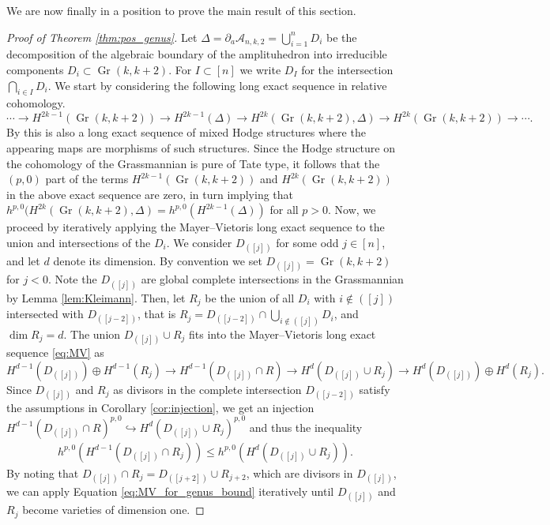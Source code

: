 \documentclass[12pt]{extarticle}
\theoremstyle{definition}
\theoremstyle{theorem}
\theoremstyle{remark}
\numberwithin{equation}{section}
\newcommand{\grk}{\operatorname{Gr}(k,k+2)}
\newcommand{\aA}{\mathcal{A}}
\newcommand{\odd}[1]{([#1])}
\begin{document}
We are now finally in a position to prove the main result of this section.

\begin{proof}[Proof of Theorem \ref{thm:pos_genus}]
    Let $\Delta = \partial_a\aA_{n,k,2}=\bigcup_{i=1}^{n}D_i$ be the decomposition of the algebraic boundary of the amplituhedron into irreducible components $D_i\subset\grk$.
    For $I\subset [n]$ we write $D_I$ for the intersection $\bigcap_{i\in I}D_i$.
    We start by considering the following long exact sequence in relative cohomology.
    \[
    \cdots \to H^{2k-1}(\grk)\to H^{2k-1}(\Delta)\to H^{2k}(\grk,\Delta)\to H^{2k}(\grk)\to\cdots.
    \]
    By \cite[Proposition 5.46]{MHS} this is also a long exact sequence of mixed Hodge structures where the appearing maps are morphisms of such structures.
    Since the Hodge structure on the cohomology of the Grassmannian is pure of Tate type, it follows that the $(p,0)$ part of the terms $H^{2k-1}(\grk)$ and $H^{2k}(\grk)$ in the above exact sequence are zero, in turn implying that $h^{p,0}(H^{2k}(\grk,\Delta)=h^{p,0}(H^{2k-1}(\Delta))$ for all $p>0$.
    Now, we proceed by iteratively applying the Mayer--Vietoris long exact sequence to the union and intersections of the $D_i$.
    We consider $D_{\odd j}$ for some odd $j\in [n]$, and let $d$ denote its dimension.
    By convention we set $D_{\odd j}=\grk$ for $j<0$.
    Note the $D_{\odd j}$ are global complete intersections in the Grassmannian by Lemma \ref{lem:Kleimann}.
    Then, let $R_j$ be the union of all $D_i$ with $i\notin\odd j$ intersected with $D_{\odd{j-2}}$, that is $R_j=D_{\odd{j-2}}\cap \bigcup_{i\notin \odd j}D_i$, and $\dim R_j=d$.
    The union $D_{\odd j}\cup R_j$ fits into the Mayer--Vietoris long exact sequence \eqref{eq:MV} as 
    \begin{equation}\label{eq:MV_for_genus_bound}
        H^{d-1}(D_{\odd j}) \oplus H^{d-1}(R_j) \to H^{d-1}(D_{\odd j} \cap R) \to H^{d}(D_{\odd j}\cup R_j) \to H^{d}(D_{\odd j}) \oplus H^{d}(R_j).
    \end{equation}
    Since $D_{\odd j}$ and $R_j$ as divisors in the complete intersection $D_{\odd{j-2}}$ satisfy the assumptions in Corollary \ref{cor:injection}, we get an injection $H^{d-1}(D_{\odd j} \cap R)^{p,0} \hookrightarrow H^{d}(D_{\odd j}\cup R_j)^{p,0}$ and thus the inequality 
\begin{align}\label{eq:dim_inequality}
        h^{p,0}(H^{d-1}(D_{\odd j} \cap R_j))\leq h^{p,0}( H^{d}(D_{\odd j}\cup R_j)).
    \end{align}
    By noting that $D_{\odd j}\cap R_j=D_{\odd{j+2}}\cup R_{j+2}$, which are divisors in $D_{\odd j}$, we can apply Equation \eqref{eq:MV_for_genus_bound} iteratively until $D_{\odd j}$ and $R_j$ become varieties of dimension one.

\end{proof}
\end{document}
